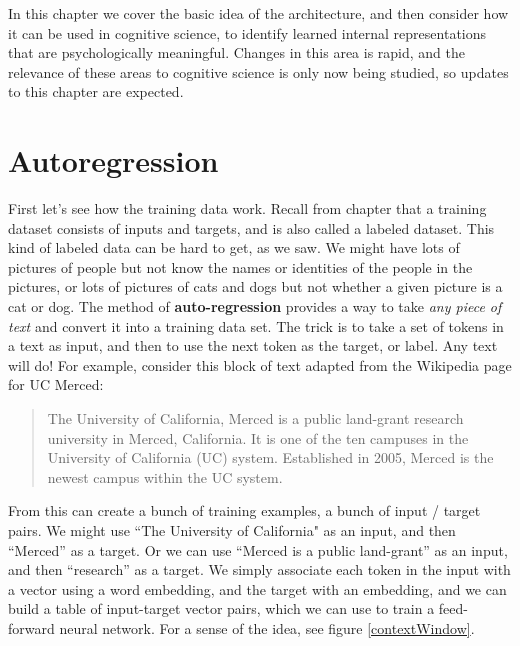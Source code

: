 
In this chapter we cover the basic idea of the architecture, and then consider how it can be used in cognitive science, to identify learned internal representations that are psychologically meaningful. Changes in this area is rapid, and the relevance of these areas to cognitive science is only now being studied, so updates to this chapter are expected.

\section{Autoregression}

First let's see how the training data work. Recall from chapter  that a training dataset consists of inputs and targets, and is also called a labeled dataset. This kind of labeled data can be hard to get, as we saw.  We might have lots of pictures of people but not know the names or identities of the people in the pictures, or lots of pictures of cats and dogs but not whether a given picture is a cat or dog.  The method of  \textbf{auto-regression} provides a way to take \emph{any piece of text} and convert it into a training data set. The trick is to take a set of tokens in a text as input, and then to use the next token as the target, or label.  Any text will do! For example, consider this block of text adapted from the Wikipedia page for UC Merced:

\begin{quote}
The University of California, Merced is a public land-grant research university in Merced, California. It is one of the ten campuses in the University of California (UC) system. Established in 2005, Merced is the newest campus within the UC system.
\end{quote}

From this can create a bunch of training examples, a bunch of input / target pairs. We might use ``The University of California" as an input, and then ``Merced'' as a target. Or we can use ``Merced is a public land-grant'' as an input, and then ``research'' as a target.  We simply associate each token in the input with a vector using a word embedding, and the target with an embedding, and we can build a table of input-target vector pairs, which we can use to train a feed-forward neural network.  For a sense of the idea, see figure \ref{contextWindow}. 

